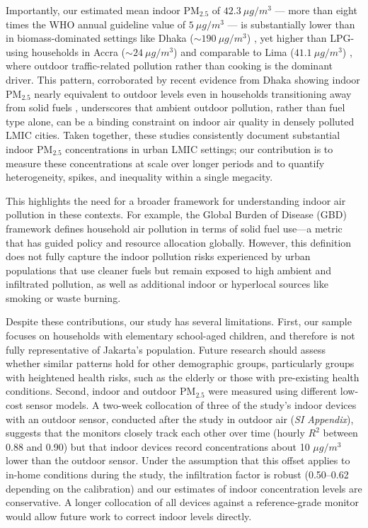 \documentclass[9pt,twocolumn,twoside]{pnas-new}
\begin{document}
Importantly, our estimated mean indoor PM$_{2.5}$ of $42.3~\mu g/m^3$ --- more than eight times the WHO annual guideline value of $5~\mu g/m^3$ --- is substantially lower than in biomass-dominated settings like Dhaka ($\sim 190~\mu g/m^3$) \citep{GURLEY201311}, yet higher than LPG-using households in Accra ($\sim 24~\mu g/m^3$) \citep{zhou2011household} and comparable to Lima ($41.1~\mu g/m^3$) \citep{kephart2020indoor}, where outdoor traffic-related pollution rather than cooking is the dominant driver. This pattern, corroborated by recent evidence from Dhaka showing indoor PM$_{2.5}$ nearly equivalent to outdoor levels even in households transitioning away from solid fuels \citep{Sahaetal2025}, underscores that ambient outdoor pollution, rather than fuel type alone, can be a binding constraint on indoor air quality in densely polluted LMIC cities. Taken together, these studies consistently document substantial indoor PM$_{2.5}$ concentrations in urban LMIC settings; our contribution is to measure these concentrations at scale over longer periods and to quantify heterogeneity, spikes, and inequality within a single megacity.


This highlights the need for a broader framework for understanding indoor air pollution in these contexts. For example, the Global Burden of Disease (GBD) framework defines household air pollution in terms of solid fuel use—a metric that has guided policy and resource allocation globally. However, this definition does not fully capture the indoor pollution risks experienced by urban populations that use cleaner fuels but remain exposed to high ambient and infiltrated pollution, as well as additional indoor or hyperlocal sources like smoking or waste burning. 


Despite these contributions, our study has several limitations. First, our sample focuses on  households with elementary school-aged children, and therefore is not fully representative of Jakarta’s population. Future research should assess whether similar patterns hold for other demographic groups, particularly groups with heightened health risks, such as the elderly or those with pre-existing health conditions. 
Second, indoor and outdoor PM$_{2.5}$ were measured using different low-cost sensor models. A two-week collocation of three of the study's indoor devices with an outdoor sensor, conducted after the study in outdoor air (\textit{SI Appendix}), suggests that the monitors closely track each other over time (hourly $R^2$ between 0.88 and 0.90) but that indoor devices record concentrations about 10 $\mu g/m^3$ lower than the outdoor sensor. Under the assumption that this offset applies to in-home conditions during the study, the infiltration factor is robust (0.50--0.62 depending on the calibration) and our estimates of indoor concentration levels are conservative. A longer collocation of all devices against a reference-grade monitor would allow future work to correct indoor levels directly.
\end{document}
